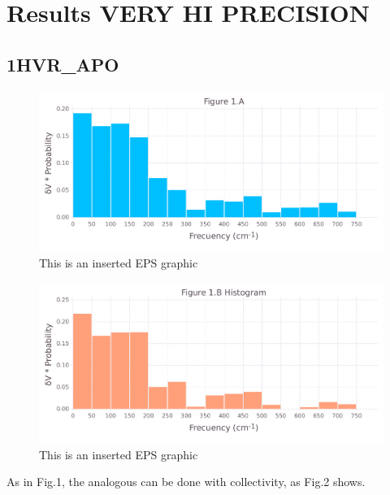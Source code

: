 \documentclass[10pt,letterpaper]{article}
\begin{document}
\FloatBarrier
\newpage


\section{Results VERY HI PRECISION}
\subsection{1HVR\_APO}

\begin{figure}[ht]
\begin{center}
\includegraphics[scale=0.5]{1hvr_apo/1afigure_very_hi-precision.pdf}
\caption{This is an inserted EPS graphic}
\label{fig1}
\end{center}
\end{figure}

\begin{figure}[ht]
\begin{center}
\includegraphics[scale=0.5]{1hvr_apo/1bfigure_very_hi-precision.pdf}
\caption{This is an inserted EPS graphic}
\label{fig2}
\end{center}
\end{figure}

\clearpage
As in Fig.1, the analogous can be done with collectivity, as Fig.2 shows. 
\end{document}

